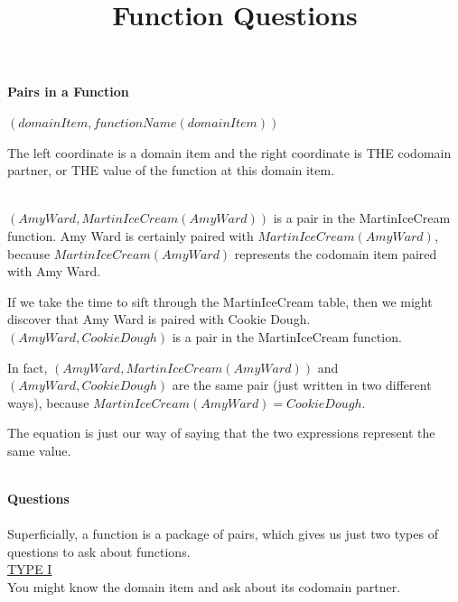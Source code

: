 \documentclass{ximera}
\title{Function Questions}
\begin{document}
\begin{abstract}
\end{abstract}

\maketitle





\textbf{Pairs in a Function} \\


\begin{center}
\textbf{$(domainItem, functionName(domainItem))$}
\end{center}

The left coordinate is a domain item and the right coordinate is THE codomain partner, or THE value of the function at this domain item.
\quad \\

\begin{example}
\quad \\
$(Amy Ward, MartinIceCream(Amy Ward))$ is a pair in the MartinIceCream function. Amy Ward is certainly paired with $MartinIceCream(Amy Ward)$, because $MartinIceCream(Amy Ward)$ represents the codomain item paired with Amy Ward.

If we take the time to sift through the MartinIceCream table, then we might discover that Amy Ward is paired with Cookie Dough.  $(Amy Ward, Cookie Dough)$ is a pair in the MartinIceCream function. 

In fact, $(Amy Ward, MartinIceCream(Amy Ward))$ and $(Amy Ward, Cookie Dough)$ are the same pair (just written in two different ways), because $MartinIceCream(Amy Ward) = Cookie Dough$.

The equation is just our way of saying that the two expressions represent the same value.        

\end{example}


\quad \\



\textbf{Questions} \\
\quad \\

Superficially, a function is a package of pairs, which gives us just two types of questions to ask about functions.
\quad \\

\underline{TYPE I} \\
You might know the domain item and ask about its codomain partner. 
\end{document}
